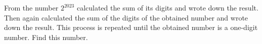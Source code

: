 From the number $2^{2023}$ calculated the sum of its digits and wrote down the result. Then again calculated the sum of the digits of the obtained number and wrote down the result. This process is repeated until the obtained number is a one-digit number. Find this number.
